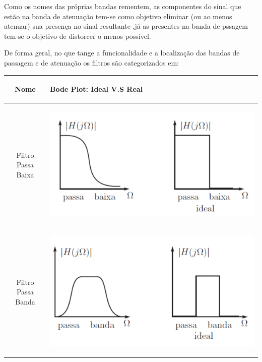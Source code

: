 \documentclass{article}
\begin{document}
Como os nomes das próprias bandas rementem, as componentes do sinal que estão na banda de atenuação tem-se como objetivo eliminar (ou ao menos atenuar) sua presença no sinal resultante ,já as presentes na banda de pssagem tem-se o objetivo de distorcer o menos possível.

De forma geral, no que tange a funcionalidade e a localização das bandas de passagem e de atenuação os filtros são categorizados em:
\begin{table}[h!]
    \centering
    \begin{tabularx}{\textwidth}{|c|X|}\hline
         \textbf{Nome} & \begin{center}
             
         \textbf{Bode Plot: Ideal V.S Real}  \end{center}\\ \hline
         Filtro Passa Baixa &  \begin{center}
          \begin{minipage}{0.3\textwidth}
              \centering
              \includegraphics[width=\textwidth]{imgs/passa_baixa.jpeg}
          \end{minipage} \end{center}\\ \hline

          
                Filtro Passa Banda &  \begin{center}
                    
                \begin{minipage}{0.3\textwidth}
              \centering
              \includegraphics[width=\textwidth]{imgs/passa_banda.jpeg}
          \end{minipage} \end{center}\\ \hline


\end{tabularx}
\end{table}
\end{document}
